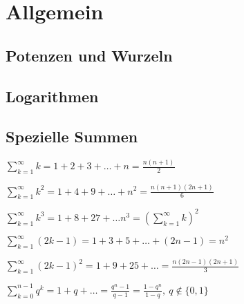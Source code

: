 
\section{Allgemein}

\subsection{Potenzen und Wurzeln}

\subsection{Logarithmen}

\subsection{Spezielle Summen}
\begin{compactitem}
    \item $\sum_{k=1}^{\infty} k = 1 + 2 + 3 + \dots + n = \frac{n(n+1)}{2}$
    \item $\sum_{k=1}^{\infty} k^2 = 1 + 4 + 9 + \dots + n^2 = \frac{n(n+1)(2n+1)}{6}$
    \item $\sum_{k=1}^{\infty} k^3 = 1 + 8 + 27 + \dots n^3 = \left( \sum_{k=1}^{\infty} k  \right)^2$
    \item $\sum_{k=1}^{\infty} (2k - 1) = 1 + 3 + 5 + \dots + (2n -1) = n^2$
    \item $\sum_{k=1}^{\infty} (2k - 1)^2 = 1 + 9 + 25 + \dots = \frac{n(2n-1)(2n+1)}{3}$
    \item $\sum_{k=0}^{n-1} q^k = 1 + q + \dots = \frac{q^n-1}{q-1} = \frac{1 - q^n}{1-q}, \ q \not\in \{0, 1\}$
\end{compactitem}
